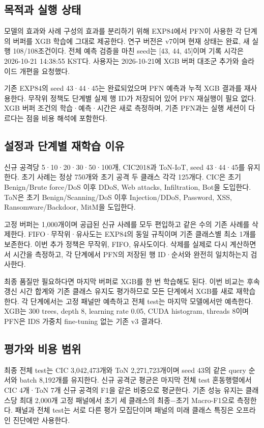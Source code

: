 

\subsection{목적과 실행 상태}
모델의 효과와 사례 구성의 효과를 분리하기 위해 EXP84에서 PFN이 사용한 각 단계의 버퍼를 XGB 학습에 그대로 제공한다. 연구 버전은 v7이며 현재 상태는 완료, 새 실행 108/\allowbreak{}108조건이다. 전체 예측 검증을 마친 seed는 [43, 44, 45]이며 기록 시각은 2026-10-21 14:38:55 KST다. 사용자는 2026-10-21에 XGB 버퍼 대조군 추가와 슬라이드 개편을 요청했다.

기존 EXP84의 seed 43·44·45는 완료되었으며 PFN 예측과 누적 XGB 결과를 재사용한다. 무작위 정책도 단계별 실제 행 ID가 저장되어 있어 PFN 재실행이 필요 없다. XGB 버퍼 조건의 학습·예측·시간은 새로 측정하며, 기존 PFN과는 실행 세션이 다르다는 점을 비용 해석에 포함한다.

\subsection{설정과 단계별 재학습 이유}
신규 공격당 5·10·20·30·50·100개, CIC2018과 ToN-IoT, seed 43·44·45를 유지한다. 초기 사례는 정상 750개와 초기 공격 두 클래스 각각 125개다. CIC은 초기 Benign/\allowbreak{}Brute force/\allowbreak{}DoS 이후 DDoS, Web attacks, Infiltration, Bot을 도입한다. ToN은 초기 Benign/\allowbreak{}Scanning/\allowbreak{}DoS 이후 Injection/\allowbreak{}DDoS, Password, XSS, Ransomware/\allowbreak{}Backdoor, MitM을 도입한다.

고정 버퍼는 1,000개이며 공급된 신규 사례를 모두 편입하고 같은 수의 기존 사례를 삭제한다. FIFO·무작위·유사도는 EXP84의 동일 규칙이며 기존 클래스별 최소 1개를 보존한다. 이번 추가 정책은 무작위, FIFO, 유사도이다. 삭제를 실제로 다시 계산하면서 시간을 측정하고, 각 단계에서 PFN의 저장된 행 ID·순서와 완전히 일치하는지 검사한다.

최종 품질만 필요하다면 마지막 버퍼로 XGB를 한 번 학습해도 된다. 이번 비교는 후속 갱신 시간 합계와 기존 클래스 유지도 평가하므로 모든 단계에서 XGB를 새로 재학습한다. 각 단계에서는 고정 패널만 예측하고 전체 test는 마지막 모델에서만 예측한다. XGB는 300 trees, depth 8, learning rate 0.05, CUDA histogram, threads 8이며 PFN은 IDS 가중치 fine-tuning 없는 기존 v3 결과다.

\subsection{평가와 비용 범위}
최종 전체 test는 CIC 3,042,473개와 ToN 2,271,723개이며 seed 43의 같은 query 순서와 batch 8,192개를 유지한다. 신규 공격군 평균은 마지막 전체 test 혼동행렬에서 CIC 4개·ToN 7개 신규 공격의 F1을 같은 비중으로 평균한다. 기존 성능 유지는 클래스당 최대 2,000개 고정 패널에서 초기 세 클래스의 최종−초기 Macro-F1으로 측정한다. 패널과 전체 test는 서로 다른 평가 모집단이며 패널의 미래 클래스 특징은 오프라인 진단에만 사용한다.

